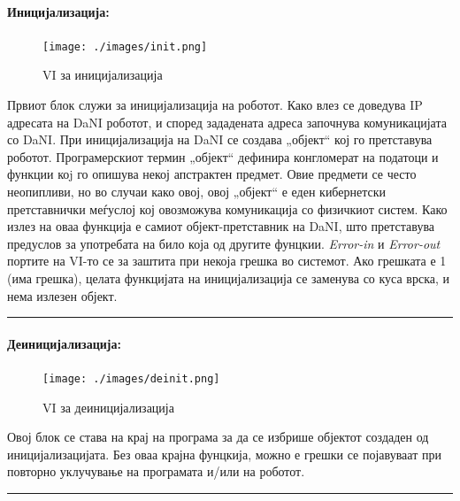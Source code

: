 \documentclass[11pt]{article}
\begin{document}
		\paragraph{Иницијализација:\\}
			\begin{figure}[h]
        \centering
				\texttt{[image: ./images/init.png]}
				\caption{VI за иницијализација}
				\label{fig:init.png}
				\end{figure}
		  Првиот блок служи за иницијализација на роботот. Како влез се доведува IP адресата на DaNI роботот, и според зададената адреса започнува комуникацијата со DaNI. При иницијализација на DaNI се создава „објект“ кој го претставува роботот. Програмерскиот термин „објект“ дефинира конгломерат на податоци и функции коj го опишува некој апстрактен предмет. Овие предмети се често неопипливи, но во случаи како овој, овој „објект“ е еден кибернетски претставнички меѓуслој кој овозможува комуникација со физичкиот систем. Како излез на оваа функција е самиот објект-претставник на DaNI, што претставува предуслов за употребата на било која од другите фунцкии. \textit{Error-in} и \textit{Error-out} портите на VI-то се за заштита при некоја грешка во системот. Ако грешката е 1 (има грешка), целата функцијата на иницијализација се заменува со куса врска, и нема излезен објект.
      \\
      \textcolor[RGB]{150,150,150}{\rule{\linewidth}{1.6pt}}

    \paragraph{Деиницијализација:\\}
    	\begin{figure}[h]
        \centering
        \texttt{[image: ./images/deinit.png]}
				\caption{VI за деиницијализација}
				\label{fig:deinit.png}
				\end{figure}
      Овој блок се става на крај на програма за да се избрише објектот создаден од иницијализацијата. Без оваа крајна фунцкија, можно е грешки се појавуваат при повторно уклучување на програмата и/или на роботот.\\
      \textcolor[RGB]{150,150,150}{\rule{\linewidth}{1.6pt}}
\end{document}
